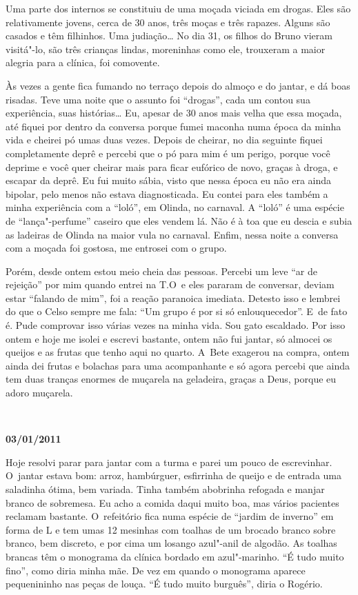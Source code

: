 Uma parte dos internos se constituiu de uma moçada viciada em drogas.
Eles são relativamente jovens, cerca de 30 anos, três moças e três
rapazes. Alguns são casados e têm filhinhos. Uma judiação… No dia
31, os filhos do Bruno vieram visitá"-lo, são três crianças lindas,
moreninhas como ele, trouxeram a maior alegria para a clínica, foi
comovente.

Às vezes a gente fica fumando no terraço depois do almoço e do jantar, e
dá boas risadas. Teve uma noite que o assunto foi ``drogas'', cada um
contou sua experiência, suas histórias… Eu, apesar de 30 anos
mais velha que essa moçada, até fiquei por dentro da conversa porque
fumei maconha numa época da minha vida e cheirei pó umas duas vezes.
Depois de cheirar, no dia seguinte fiquei completamente deprê e percebi
que o pó para mim é um perigo, porque você deprime e você quer cheirar
mais para ficar eufórico de novo, graças à droga, e escapar da deprê. Eu
fui muito sábia, visto que nessa época eu não era ainda bipolar, pelo
menos não estava diagnosticada. Eu contei para eles também a minha
experiência com a ``loló'', em Olinda, no carnaval. A ``loló'' é uma
espécie de ``lança"-perfume'' caseiro que eles vendem lá. Não é à toa que
eu descia e subia as ladeiras de Olinda na maior vula no carnaval.
Enfim, nessa noite a conversa com a moçada foi gostosa, me entrosei com
o grupo.

Porém, desde ontem estou meio cheia das pessoas. Percebi um leve ``ar de
rejeição'' por mim quando entrei na T.O\, e eles pararam de conversar,
deviam estar ``falando de mim'', foi a reação paranoica imediata. Detesto
isso e lembrei do que o Celso sempre me fala: ``Um grupo é por si só
enlouquecedor''. E~de fato é. Pude comprovar isso várias vezes na minha
vida. Sou gato escaldado. Por isso ontem e hoje me isolei e escrevi
bastante, ontem não fui jantar, só almocei os queijos e as frutas que
tenho aqui no quarto. A~Bete exagerou na compra, ontem ainda dei frutas
e bolachas para uma acompanhante e só agora percebi que ainda tem duas
tranças enormes de muçarela na geladeira, graças a Deus, porque eu adoro
muçarela.

\begin{center}\asterisc{}​\end{center}

\begin{flushright}\textbf{03/01/2011}\end{flushright}


Hoje resolvi parar para jantar com a turma e parei um pouco de
escrevinhar. O~jantar estava bom: arroz, hambúrguer, esfirrinha de
queijo e de entrada uma saladinha ótima, bem variada. Tinha também
abobrinha refogada e manjar branco de sobremesa. Eu acho a comida daqui
muito boa, mas vários pacientes reclamam bastante. O~refeitório fica
numa espécie de ``jardim de inverno'' em forma de L e tem umas 12
mesinhas com toalhas de um brocado branco sobre branco, bem discreto, e
por cima um losango azul"-anil de algodão. As toalhas brancas têm o
monograma da clínica bordado em azul"-marinho. ``É tudo muito fino'',
como diria minha mãe. De vez em quando o monograma aparece pequenininho
nas peças de louça. ``É tudo muito burguês'', diria o Rogério.

